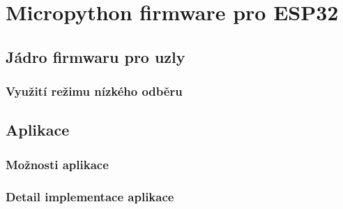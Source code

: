 \chapter{Micropython firmware pro ESP32}
\label{ch:firmware}


\section{Jádro firmwaru pro uzly}

\subsection{Využití režimu nízkého odběru}

\section{Aplikace}

\subsection{Možnosti aplikace}

\subsection{Detail implementace aplikace}

